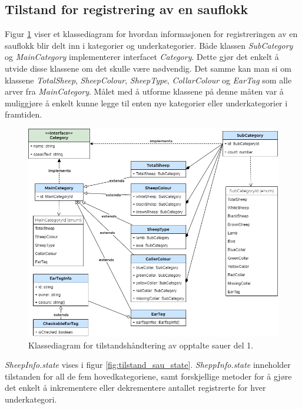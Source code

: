 \subsection{Tilstand for registrering av en sauflokk}
Figur \ref{fig:tilstand_sau} viser et klassediagram for hvordan informasjonen for registreringen av en sauflokk blir delt inn i kategorier og underkategorier. Både klassen \textit{SubCategory} og \textit{MainCategory} implementerer interfacet \textit{Category}. Dette gjør det enkelt å utvide disse klassene om det skulle være nødvendig. Det samme kan man si om klassene \textit{TotalSheep}, \textit{SheepColour}, \textit{SheepType}, \textit{CollarColour} og \textit{EarTag} som alle arver fra \textit{MainCategory}. Målet med å utforme klassene på denne måten var å muliggjøre å enkelt kunne legge til enten nye kategorier eller underkategorier i framtiden.
\begin{figure}[H]
\centering
\captionsetup{width=.8\linewidth}
\includegraphics[scale=0.6]{Figurer/diagram/tilstand_sau.png}
\caption{Klassediagram for tilstandshåndtering av opptalte sauer del 1.}
\label{fig:tilstand_sau}
\end{figure}

\noindent
\textit{SheepInfo.state} vises i figur \ref{fig:tilstand_sau_state}. \textit{SheppInfo.state} inneholder tilstanden for all de fem hovedkategoriene, samt forskjellige metoder for å gjøre det enkelt å inkrementere eller dekrementere antallet registrerte for hver underkategori.

